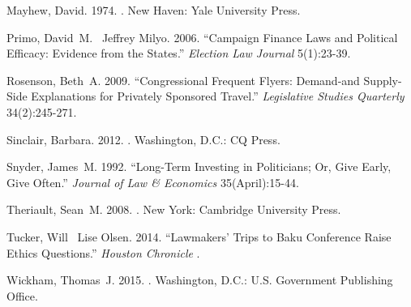 \documentclass[12pt]{article}                           %
\begin{document}
\begin{thebibliography}{xx}
Mayhew, David. 1974.
.
\newblock New Haven:  {Yale University Press}.

Primo, David~M. \harvardand\ Jeffrey Milyo. 2006.
\newblock ``Campaign Finance Laws and Political Efficacy: Evidence from the States.'' {\em Election Law Journal} 5(1):23-39.

Rosenson, Beth~A. 2009.
\newblock ``Congressional {{Frequent Flyers}}: {{Demand}}-and {{Supply}}-{{Side
  Explanations}} for {{Privately Sponsored Travel}}.'' {\em Legislative Studies
  Quarterly} 34(2):245-271.

Sinclair, Barbara. 2012.
.
\newblock Washington, D.C.:  {CQ Press}.

Snyder, James~M. 1992.
\newblock ``Long-{{Term Investing}} in {{Politicians}}; {{Or}}, {{Give Early}},
  {{Give Often}}.'' {\em Journal of Law \& Economics} 35(April):15-44.

Theriault, Sean~M. 2008.
.
\newblock New York:  {Cambridge University Press}.

Tucker, Will \harvardand\ Lise Olsen. 2014.
\newblock ``Lawmakers' Trips to {{Baku}} Conference Raise Ethics Questions.''
  {\em Houston Chronicle} .

Wickham, Thomas~J. 2015.
.
\newblock Washington, D.C.:  {U.S. Government Publishing Office}.

\end{thebibliography}

\newpage
\clearpage
\end{document}
